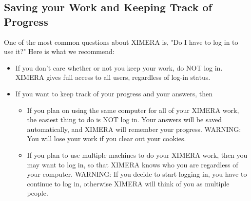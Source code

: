 \documentclass{ximera}
\begin{document}
\subsection*{Saving your Work and Keeping Track of Progress}
One of the most common questions about XIMERA is, "Do I have to log in to use it?"  Here is what we recommend:
\begin{itemize}
\item If you don't care whether or not you keep your work, do NOT log in.  XIMERA gives full access to all users, regardless of log-in status.
\item If you want to keep track of your progress and your answers, then
\begin{itemize}
\item If you plan on using the same computer for all of your XIMERA work, the easiest thing to do is NOT log in.  Your answers will be saved automatically, and XIMERA will remember your progress.  WARNING: You will lose your work if you clear out your cookies.
\item If you plan to use multiple machines to do your XIMERA work, then you may want to log in, so that XIMERA knows who you are regardless of your computer.  WARNING: If you decide to start logging in, you have to continue to log in, otherwise XIMERA will think of you as multiple people.
\end{itemize}
\end{itemize}
\end{document}
